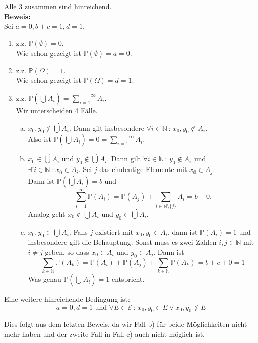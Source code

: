 \documentclass[11pt,a4paper,ngerman]{article}
\begin{document}
Alle 3 zusammen sind hinreichend.\\
\textbf{Beweis:}\\
Sei $a = 0, b+c = 1, d = 1$.
\begin{enumerate}[1.]
    \item z.z. $\mathbb{P}(\emptyset) = 0$.\\
        Wie schon gezeigt ist $\mathbb{P}(\emptyset) = a = 0$.
    \item z.z. $\mathbb{P}(\Omega) = 1$.\\
        Wie schon gezeigt ist $\mathbb{P}(\Omega) = d = 1$.
    \item z.z. $\mathbb{P}(\dot\bigcup A_i) = \overset{\infty}{\underset{i=1}{\sum}} A_i$.\\
        Wir unterscheiden 4 Fälle.
        \begin{enumerate}[a.]
            \item $x_0, y_0 \not\in \dot\bigcup A_i$. Dann gilt insbesondere $\forall i\in \mathbb{N} \, : \, x_0, y_0 \not\in A_i$.\\
                Also ist $\mathbb{P}(\dot\bigcup A_i) = 0 = \overset{\infty}{\underset{i=1}{\sum}} A_i $.
            \item $x_0 \in \dot\bigcup A_i$ und $y_0 \not\in \dot\bigcup A_i$. Dann gilt $\forall i \in \mathbb{N} \, : \, y_0 \not\in A_i$ und
                $\exists ! i \in \mathbb{N} \, : \, x_0 \in A_i$. Sei $j$ das eindeutige Elemente mit $x_0 \in A_j$.\\
                Dann ist $\mathbb{P}(\dot\bigcup A_i) = b$ und
                \[
                    \overset{\infty}{\underset{i=1}{\sum}} \mathbb{P}(A_i) = \mathbb{P}(A_j) + \underset{i \in \mathbb{N} \setminus \{j \}}{\sum} A_i = b + 0.
                \]
                Analog geht $x_0 \not\in \dot\bigcup A_i$ und $y_0 \in \dot\bigcup A_i$.\\
            \item $x_0, y_0 \in \dot\bigcup A_i$. Falls $j$ existiert mit $x_0, y_0 \in A_i$, dann ist $\mathbb{P}(A_i) = 1$ und insbesondere gilt die Behauptung.
                Sonst muss es zwei Zahlen $i,j \in \mathbb{N}$ mit $i \not= j$ geben, so dass $x_0 \in A_i$ und $y_0 \in A_j$.
                Dann ist
                \[
                    \underset{k \in \mathbb{N}}{\sum} \mathbb{P}(A_k) = \mathbb{P}(A_i) + \mathbb{P}(A_j) + \underset{k \in \mathbb{N}}{\sum} \mathbb{P}(A_k) = b + c + 0 = 1
                \]
                Was genau $\mathbb{P}(\dot\bigcup A_i) = 1$ entspricht.
        \end{enumerate}
\end{enumerate}

Eine weitere hinreichende Bedingung ist:
\[
    a = 0, d = 1 \text{ und } \forall E \in \mathcal{E} \, : \, x_0, y_0 \in E \lor x_0, y_0 \not\in E
\]

Dies folgt aus dem letzten Beweis, da wir Fall b) für beide Möglichkeiten nicht mehr haben und der zweite Fall in Fall c) auch nicht möglich ist.

\label{LastPage}
\end{document}
